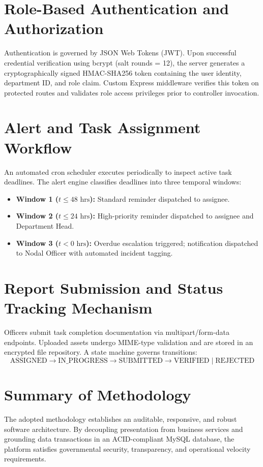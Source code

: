 \section{Role-Based Authentication and Authorization}
\label{sec:auth_auth}
Authentication is governed by JSON Web Tokens (JWT). Upon successful credential verification using bcrypt (salt rounds = 12), the server generates a cryptographically signed HMAC-SHA256 token containing the user identity, department ID, and role claim. Custom Express middleware verifies this token on protected routes and validates role access privileges prior to controller invocation.

\section{Alert and Task Assignment Workflow}
\label{sec:workflow}
An automated cron scheduler executes periodically to inspect active task deadlines. The alert engine classifies deadlines into three temporal windows:
\begin{itemize}
    \item \textbf{Window 1 ($t \le 48\text{ hrs}$):} Standard reminder dispatched to assignee.
    \item \textbf{Window 2 ($t \le 24\text{ hrs}$):} High-priority reminder dispatched to assignee and Department Head.
    \item \textbf{Window 3 ($t < 0\text{ hrs}$):} Overdue escalation triggered; notification dispatched to Nodal Officer with automated incident tagging.
\end{itemize}

\section{Report Submission and Status Tracking Mechanism}
\label{sec:report_submission}
Officers submit task completion documentation via multipart/form-data endpoints. Uploaded assets undergo MIME-type validation and are stored in an encrypted file repository. A state machine governs transitions:
\begin{equation}
    \text{ASSIGNED} \longrightarrow \text{IN\_PROGRESS} \longrightarrow \text{SUBMITTED} \longrightarrow \text{VERIFIED} \mid \text{REJECTED}
\end{equation}

\section{Summary of Methodology}
\label{sec:meth_summary}
The adopted methodology establishes an auditable, responsive, and robust software architecture. By decoupling presentation from business services and grounding data transactions in an ACID-compliant MySQL database, the platform satisfies governmental security, transparency, and operational velocity requirements.
